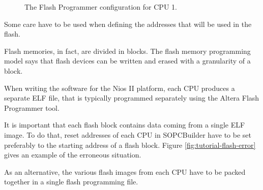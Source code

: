 %
\begin{figure}


\caption{\label{fig:tutorial-flash-programmer-cpu1}The Flash
Programmer configuration for CPU 1.}
\end{figure}

\begin{warning}
Some care have to be used when defining the addresses that will be
used in the flash.

Flash memories, in fact, are divided in blocks. The flash memory
programming model says that flash devices can be written and erased
with a granularity of a block.

When writing the software for the Nios II platform, each CPU produces
a separate ELF file, that is typically programmed separately using the
Altera Flash Programmer tool.

It is important that each flash block contains data coming from a
single ELF image. To do that, reset addresses of each CPU in
SOPCBuilder have to be set preferably to the starting address of a
flash block. Figure \ref{fig:tutorial-flash-error} gives an example of
the erroneous situation.

As an alternative, the various flash images from each CPU have to be
packed together in a single flash programming file.
\end{warning}

